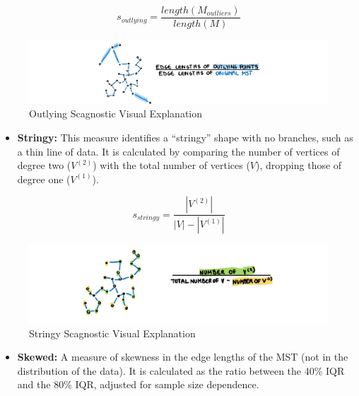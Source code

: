 \[s_{outlying}=\frac{length(M_{outliers})}{length(M)}\]

\begin{Schunk}
\begin{figure}
\includegraphics[width=1\linewidth,height=0.2\textheight]{figures/drawoutlying} \caption[Outlying Scagnostic Visual Explanation]{Outlying Scagnostic Visual Explanation}\label{fig:outlyingscag}
\end{figure}
\end{Schunk}

\begin{itemize}
\tightlist
\item
  \textbf{Stringy:} This measure identifies a ``stringy'' shape with no
  branches, such as a thin line of data. It is calculated by comparing
  the number of vertices of degree two (\(V^{(2)}\)) with the total
  number of vertices (\(V\)), dropping those of degree one
  (\(V^{(1)}\)).
\end{itemize}

\[s_{stringy} = \frac{|V^{(2)}|}{|V|-|V^{(1)}|}\]

\begin{Schunk}
\begin{figure}
\includegraphics[width=1\linewidth,height=0.2\textheight]{figures/drawstringy} \caption[Stringy Scagnostic Visual Explanation]{Stringy Scagnostic Visual Explanation}\label{fig:stringyscag}
\end{figure}
\end{Schunk}

\begin{itemize}
\tightlist
\item
  \textbf{Skewed:} A measure of skewness in the edge lengths of the MST
  (not in the distribution of the data). It is calculated as the ratio
  between the 40\% IQR and the 80\% IQR, adjusted for sample size
  dependence.
\end{itemize}

